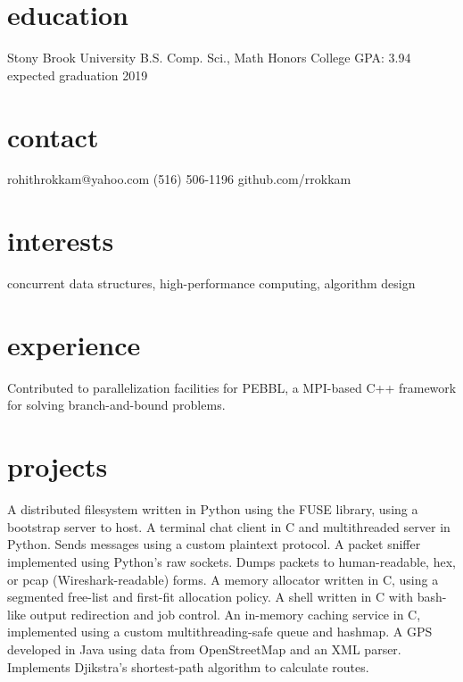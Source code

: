 \documentclass{cv}
\begin{document}

\begin{aside}
  \section{education}
    Stony Brook University
    B.S. Comp. Sci., Math
    Honors College
    GPA: 3.94
    expected graduation 2019
  \section{contact}
    rohithrokkam@yahoo.com
    (516) 506-1196
    github.com/rrokkam
\end{aside}

\section{interests}

concurrent data structures, high-performance computing, algorithm design

\section{experience}

\begin{entrylist}
    {Contributed to parallelization facilities for PEBBL, a MPI-based C++ framework for solving branch-and-bound problems.}
\end{entrylist}

\section{projects}

\begin{entrylist}
    {A distributed filesystem written in Python using the FUSE library, using a bootstrap server to host.}
    {A terminal chat client in C and multithreaded server in Python. Sends messages using a custom plaintext protocol.}
    {A packet sniffer implemented using Python's raw sockets. Dumps packets to human-readable, hex, or pcap (Wireshark-readable) forms.}
    {A memory allocator written in C, using a segmented free-list and first-fit allocation policy.}
    {A shell written in C with bash-like output redirection and job control.}
    {An in-memory caching service in C, implemented using a custom multithreading-safe queue and hashmap.}
    {A GPS developed in Java using data from OpenStreetMap and an XML parser. Implements Djikstra's shortest-path algorithm to calculate routes.}
\end{entrylist}
\end{document}
